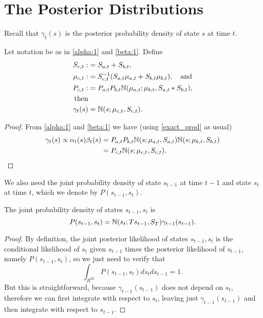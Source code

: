 \documentclass[12pt,leqno]{article}
\begin{document}
\section{The Posterior Distributions}

Recall that $\gamma_t(s)$ is the posterior probability density of state $s$
at time $t$. 
\begin{Thm}
  Let notation be as in \eqref{alpha:1} and \eqref{beta:1}.  Define
\begin{align*}
  S_{c,t} :&= S_{a,t} + S_{b,t}, \\
  \mu_{c,t} :&= S_{c,t}^{-1}(S_{a,t}\mu_{a,t} + S_{b,t}\mu_{b,t}), \quad\text{and}\\
  P_{c,t} :&= P_{a,t}P_{b,t}{\mathbb N}(\mu_{a,t};\mu_{b,t},S_{a,t}*S_{b,t}), \\
  \text{then} \\
 \gamma_t(s) &= {\mathbb N}(s;\mu_{c,t},S_{c,t}).
\end{align*}

\end{Thm}
\begin{proof}
  From \eqref{alpha:1} and \eqref{beta:1} we have (using \eqref{exact_prod}
  as usual)
  \begin{align*}
  \gamma_t(s) \propto \alpha_t(s)\beta_t(s) &= P_{a,t}P_{b,t}{\mathbb N}(s;\mu_{a,t},S_{a,t}){\mathbb N}(s;\mu_{b,t},S_{b,t})\\
  &= P_{c,t}{\mathbb N}(s;\mu_{c,t},S_{c,t}).
  \end{align*}
\end{proof}

We also need the joint probability density of state $s_{t-1}$ at time $t-1$ and state $s_t$ at time $t$,
which we denote by $P(s_{t-1},s_t)$.
\begin{Lem} \label{gamma_hat}
  The joint probability density of states $s_{t-1},s_t$ is
$$
  P(s_{t-1},s_t) = {\mathbb N}(s_t; Ts_{t-1},S_T)\gamma_{t-1}(s_{t-1}) .
$$
\end{Lem}
\begin{proof}
  By definition, the joint posterior likelihood of states $s_{t-1},s_t$ is the conditional likelihood of $s_t$ given
  $s_{t-1}$ times the posterior likelihood of $s_{t-1}$, namely $P(s_{t-1},s_t)$, so we just need to verify that
  $$
  \int_{R^{2n}} P(s_{t-1},s_t) ds_tds_{t-1} = 1.
  $$
  But this is straightforward, because $\gamma_{t-1}(s_{t-1})$ does not depend on $s_t$, therefore we can first integrate
  with respect to $s_t$, leaving just $\gamma_{t-1}(s_{t-1})$ and then integrate with respect to $s_{t-1}$.
\end{proof}
\end{document}
